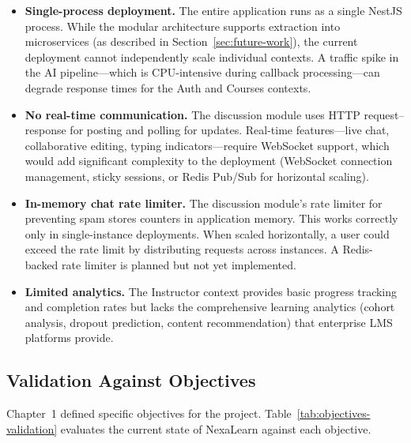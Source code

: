 \begin{itemize}
  \item \textbf{Single-process deployment.} The entire application runs as a single NestJS process. While the modular architecture supports extraction into microservices (as described in Section~\ref{sec:future-work}), the current deployment cannot independently scale individual contexts. A traffic spike in the AI pipeline---which is CPU-intensive during callback processing---can degrade response times for the Auth and Courses contexts.
  \item \textbf{No real-time communication.} The discussion module uses HTTP request--response for posting and polling for updates. Real-time features---live chat, collaborative editing, typing indicators---require WebSocket support, which would add significant complexity to the deployment (WebSocket connection management, sticky sessions, or Redis Pub/Sub for horizontal scaling).
  \item \textbf{In-memory chat rate limiter.} The discussion module's rate limiter for preventing spam stores counters in application memory. This works correctly only in single-instance deployments. When scaled horizontally, a user could exceed the rate limit by distributing requests across instances. A Redis-backed rate limiter is planned but not yet implemented.
  \item \textbf{Limited analytics.} The Instructor context provides basic progress tracking and completion rates but lacks the comprehensive learning analytics (cohort analysis, dropout prediction, content recommendation) that enterprise LMS platforms provide.
\end{itemize}

\subsection{Validation Against Objectives}

Chapter~1 defined specific objectives for the project. Table~\ref{tab:objectives-validation} evaluates the current state of NexaLearn against each objective.

